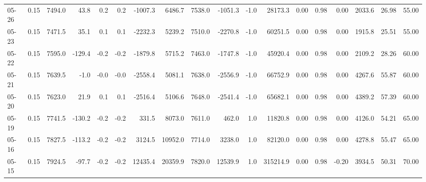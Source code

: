 \begin{threeparttable}
{\begin{tabular}{lrrrrrrrrrrrrrrrrr}
  05-26 &     0.15 & 7494.0 &              43.8 &               0.2 &                0.2 &            -1007.3 &  6486.7 & 7538.0 &    -1051.3 &                     -1.0 &             28173.3 &       0.00 &      0.98 &           0.00 &           2033.6 &           26.98 &                  55.00 \\
  05-23 &     0.15 & 7471.5 &              35.1 &               0.1 &                0.1 &            -2232.3 &  5239.2 & 7510.0 &    -2270.8 &                     -1.0 &             60251.5 &       0.00 &      0.98 &           0.00 &           1915.8 &           25.51 &                  55.00 \\
  05-22 &     0.15 & 7595.0 &            -129.4 &              -0.2 &               -0.2 &            -1879.8 &  5715.2 & 7463.0 &    -1747.8 &                     -1.0 &             45920.4 &       0.00 &      0.98 &           0.00 &           2109.2 &           28.26 &                  60.00 \\
  05-21 &     0.15 & 7639.5 &              -1.0 &              -0.0 &               -0.0 &            -2558.4 &  5081.1 & 7638.0 &    -2556.9 &                     -1.0 &             66752.9 &       0.00 &      0.98 &           0.00 &           4267.6 &           55.87 &                  60.00 \\
  05-20 &     0.15 & 7623.0 &              21.9 &               0.1 &                0.1 &            -2516.4 &  5106.6 & 7648.0 &    -2541.4 &                     -1.0 &             65682.1 &       0.00 &      0.98 &           0.00 &           4389.2 &           57.39 &                  60.00 \\
  05-19 &     0.15 & 7741.5 &            -130.2 &              -0.2 &               -0.2 &              331.5 &  8073.0 & 7611.0 &      462.0 &                      1.0 &             11820.8 &       0.00 &      0.98 &           0.00 &           4126.0 &           54.21 &                  65.00 \\
  05-16 &     0.15 & 7827.5 &            -113.2 &              -0.2 &               -0.2 &             3124.5 & 10952.0 & 7714.0 &     3238.0 &                      1.0 &             82120.0 &       0.00 &      0.98 &           0.00 &           4278.8 &           55.47 &                  65.00 \\
  05-15 &     0.15 & 7924.5 &             -97.7 &              -0.2 &               -0.2 &            12435.4 & 20359.9 & 7820.0 &    12539.9 &                      1.0 &            315214.9 &       0.00 &      0.98 &          -0.20 &           3934.5 &           50.31 &                  70.00 \\

\end{tabular}}
\end{threeparttable}
